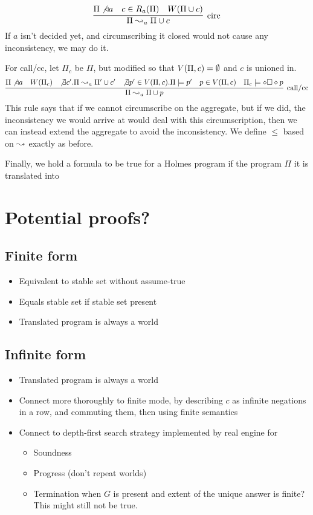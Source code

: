 \[
	\infer[\textrm{circ}]{\Pi \stepass_a \Pi \cup c}{\Pi \not \decides a & c \in \circset_a(\Pi) & W(\Pi \cup c)}
\]
If $a$ isn't decided yet, and circumscribing it closed would not cause any inconsistency, we may do it.

For call/cc, let $\Pi_c$ be $\Pi$, but modified so that $V(\Pi, c) = \emptyset$ and $c$ is unioned in.
\[
	\infer[\textrm{call/cc}]{\Pi \stepass_a \Pi \cup p}{\Pi \not \decides a & \world{\Pi_c} & \not \exists c'. \Pi \stepass_a \Pi' \cup c' & \not \exists p' \in \viol{\Pi}{c}. \Pi \models p' & p \in \viol{\Pi}{c} & \Pi_c \models \dia \boks \dia p}
\]
This rule says that if we cannot circumscribe on the aggregate, but if we did, the inconsistency we would arrive at would deal with this circumscription, then we can instead extend the aggregate to avoid the inconsistency.
We define $\leq$ based on $\leadsto$ exactly as before.

Finally, we hold a formula to be true for a Holmes program if the program $\Pi$ it is translated into

\section{Potential proofs?}
\subsection{Finite form}
\begin{itemize}
	\item Equivalent to stable set without assume-true
	\item Equals stable set if stable set present
	\item Translated program is always a world
\end{itemize}
\subsection{Infinite form}
\begin{itemize}
	\item Translated program is always a world
	\item Connect more thoroughly to finite mode, by describing $c$ as infinite negations in a row, and commuting them, then using finite semantics
	\item Connect to depth-first search strategy implemented by real engine for
		\begin{itemize}
			\item Soundness
			\item Progress (don't repeat worlds)
			\item Termination when $G$ is present and extent of the unique answer is finite? This might still not be true.
		\end{itemize}
\end{itemize}
